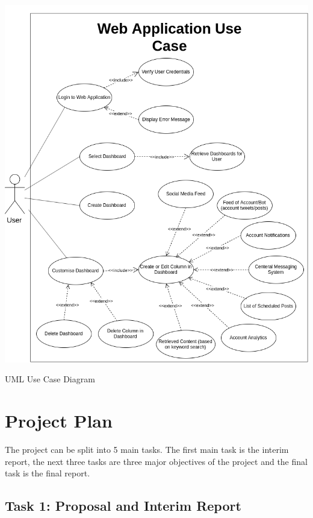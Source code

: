 \documentclass[chapterprefix=false]{scrreprt}
\begin{document}
\begin{center}
 \includegraphics[scale=0.5]{usecasewebapp-2}
 \newline
 \caption{UML Use Case Diagram}
\end{center}

\section{Project Plan}

The project can be split into 5 main tasks. The first main task is the interim report, the next three tasks are three major objectives of the project and the final task is the final report.

\subsection{Task 1: Proposal and Interim Report}
\end{document}
